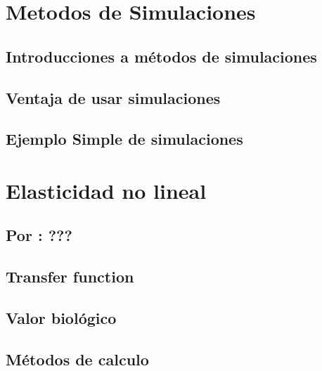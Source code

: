\documentclass[
]{book}
\theoremstyle{definition}
\theoremstyle{definition}
\theoremstyle{definition}
\theoremstyle{definition}
\theoremstyle{remark}
\begin{document}
\hypertarget{metodos-de-simulaciones}{%
\chapter{Metodos de Simulaciones}\label{metodos-de-simulaciones}}

\hypertarget{introducciones-a-muxe9todos-de-simulaciones}{%
\section{Introducciones a métodos de simulaciones}\label{introducciones-a-muxe9todos-de-simulaciones}}

\hypertarget{ventaja-de-usar-simulaciones}{%
\section{Ventaja de usar simulaciones}\label{ventaja-de-usar-simulaciones}}

\hypertarget{ejemplo-simple-de-simulaciones}{%
\section{Ejemplo Simple de simulaciones}\label{ejemplo-simple-de-simulaciones}}

\hypertarget{elasticidad-no-lineal}{%
\chapter{Elasticidad no lineal}\label{elasticidad-no-lineal}}

\hypertarget{por-1}{%
\section{Por : ???}\label{por-1}}

\hypertarget{transfer-function}{%
\section{Transfer function}\label{transfer-function}}

\hypertarget{valor-bioluxf3gico}{%
\section{Valor biológico}\label{valor-bioluxf3gico}}

\hypertarget{muxe9todos-de-calculo}{%
\section{Métodos de calculo}\label{muxe9todos-de-calculo}}
\end{document}
